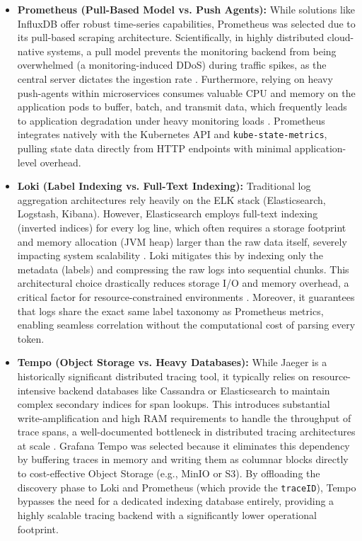 \begin{itemize}
    \item \textbf{Prometheus (Pull-Based Model vs. Push Agents):} While solutions like InfluxDB offer robust time-series capabilities, Prometheus was selected due to its pull-based scraping architecture. Scientifically, in highly distributed cloud-native systems, a pull model prevents the monitoring backend from being overwhelmed (a monitoring-induced DDoS) during traffic spikes, as the central server dictates the ingestion rate \cite{beyer_2016}. Furthermore, relying on heavy push-agents within microservices consumes valuable CPU and memory on the application pods to buffer, batch, and transmit data, which frequently leads to application degradation under heavy monitoring loads \cite{usman_2022, weng_2018}. Prometheus integrates natively with the Kubernetes API and \texttt{kube-state-metrics}, pulling state data directly from HTTP endpoints with minimal application-level overhead.
    
    \item \textbf{Loki (Label Indexing vs. Full-Text Indexing):} Traditional log aggregation architectures rely heavily on the ELK stack (Elasticsearch, Logstash, Kibana). However, Elasticsearch employs full-text indexing (inverted indices) for every log line, which often requires a storage footprint and memory allocation (JVM heap) larger than the raw data itself, severely impacting system scalability \cite{he_2021}. Loki mitigates this by indexing only the metadata (labels) and compressing the raw logs into sequential chunks. This architectural choice drastically reduces storage I/O and memory overhead, a critical factor for resource-constrained environments \cite{araujo_2024}. Moreover, it guarantees that logs share the exact same label taxonomy as Prometheus metrics, enabling seamless correlation without the computational cost of parsing every token.
    
    \item \textbf{Tempo (Object Storage vs. Heavy Databases):} While Jaeger is a historically significant distributed tracing tool, it typically relies on resource-intensive backend databases like Cassandra or Elasticsearch to maintain complex secondary indices for span lookups. This introduces substantial write-amplification and high RAM requirements to handle the throughput of trace spans, a well-documented bottleneck in distributed tracing architectures at scale \cite{kaldor_2017, sambasivan_2016}. Grafana Tempo was selected because it eliminates this dependency by buffering traces in memory and writing them as columnar blocks directly to cost-effective Object Storage (e.g., MinIO or S3). By offloading the discovery phase to Loki and Prometheus (which provide the \texttt{traceID}), Tempo bypasses the need for a dedicated indexing database entirely, providing a highly scalable tracing backend with a significantly lower operational footprint.
\end{itemize}

